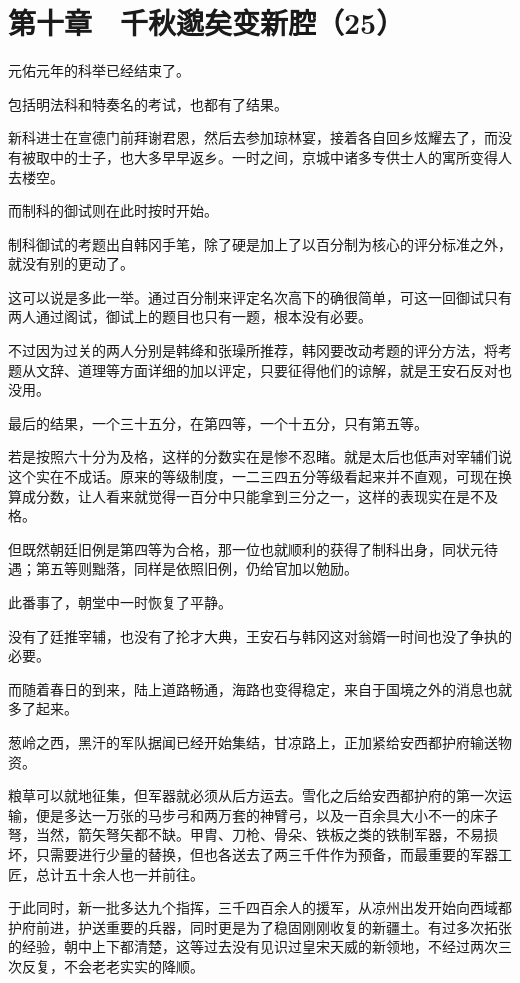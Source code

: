 \section{第十章　千秋邈矣变新腔（25）}

元佑元年的科举已经结束了。

包括明法科和特奏名的考试，也都有了结果。

新科进士在宣德门前拜谢君恩，然后去参加琼林宴，接着各自回乡炫耀去了，而没有被取中的士子，也大多早早返乡。一时之间，京城中诸多专供士人的寓所变得人去楼空。

而制科的御试则在此时按时开始。

制科御试的考题出自韩冈手笔，除了硬是加上了以百分制为核心的评分标准之外，就没有别的更动了。

这可以说是多此一举。通过百分制来评定名次高下的确很简单，可这一回御试只有两人通过阁试，御试上的题目也只有一题，根本没有必要。

不过因为过关的两人分别是韩绛和张璪所推荐，韩冈要改动考题的评分方法，将考题从文辞、道理等方面详细的加以评定，只要征得他们的谅解，就是王安石反对也没用。

最后的结果，一个三十五分，在第四等，一个十五分，只有第五等。

若是按照六十分为及格，这样的分数实在是惨不忍睹。就是太后也低声对宰辅们说这个实在不成话。原来的等级制度，一二三四五分等级看起来并不直观，可现在换算成分数，让人看来就觉得一百分中只能拿到三分之一，这样的表现实在是不及格。

但既然朝廷旧例是第四等为合格，那一位也就顺利的获得了制科出身，同状元待遇；第五等则黜落，同样是依照旧例，仍给官加以勉励。

此番事了，朝堂中一时恢复了平静。

没有了廷推宰辅，也没有了抡才大典，王安石与韩冈这对翁婿一时间也没了争执的必要。

而随着春日的到来，陆上道路畅通，海路也变得稳定，来自于国境之外的消息也就多了起来。

葱岭之西，黑汗的军队据闻已经开始集结，甘凉路上，正加紧给安西都护府输送物资。

粮草可以就地征集，但军器就必须从后方运去。雪化之后给安西都护府的第一次运输，便是多达一万张的马步弓和两万套的神臂弓，以及一百余具大小不一的床子弩，当然，箭矢弩矢都不缺。甲胄、刀枪、骨朵、铁板之类的铁制军器，不易损坏，只需要进行少量的替换，但也各送去了两三千件作为预备，而最重要的军器工匠，总计五十余人也一并前往。

于此同时，新一批多达九个指挥，三千四百余人的援军，从凉州出发开始向西域都护府前进，护送重要的兵器，同时更是为了稳固刚刚收复的新疆土。有过多次拓张的经验，朝中上下都清楚，这等过去没有见识过皇宋天威的新领地，不经过两次三次反复，不会老老实实的降顺。

